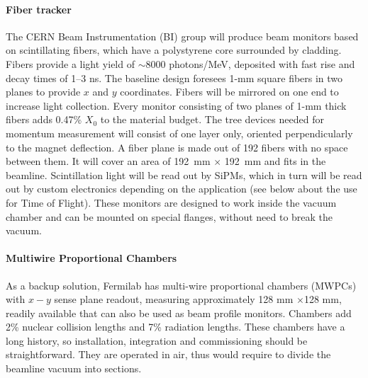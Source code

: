 \paragraph{Fiber tracker}
The CERN Beam Instrumentation (BI) group will produce
 beam monitors based on scintillating fibers, which have a polystyrene core surrounded by cladding\cite{Scifi}. Fibers provide a light yield of $\sim$8000 photons/MeV, deposited with fast rise and decay times of 1--3 ns. The baseline design foresees 1-mm square fibers in two planes to provide $x$ and $y$ coordinates. Fibers will be mirrored on one end to increase
light collection.  Every monitor consisting of two planes of 1-mm thick fibers adds 0.47\% $X_0$ to the material budget. 
 The tree devices needed for momentum measurement will consist of one layer only, oriented perpendicularly to the magnet deflection.
A fiber plane is made out of 192 fibers with no space between them. It will cover an area of 192~mm $\times$ 192~mm and fits in the beamline.
Scintillation light will be read out by SiPMs, which in turn will be read out by custom electronics depending on the application (see below about the use for Time of Flight).
%
These monitors are designed to work inside the vacuum chamber and can be mounted on special flanges, without need to break the vacuum.

\paragraph{Multiwire Proportional Chambers}
As a backup solution,
Fermilab has multi-wire proportional chambers (MWPCs) with $x-y$ sense plane
readout, measuring approximately 128 mm $\times$128 mm, readily available that can also be used as beam profile monitors.   %
Chambers add 2\% nuclear collision lengths and 7\% radiation lengths.
 These chambers have a long history, so installation, integration and commissioning should be straightforward. They are operated in air, thus would require to divide the beamline vacuum into sections.


